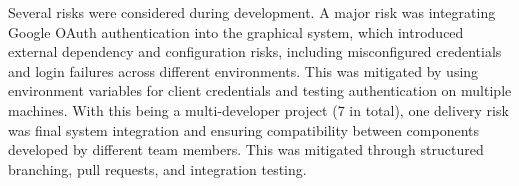 Several risks were considered during development. A major risk was integrating Google OAuth authentication into the graphical system, which introduced external dependency and configuration risks, including misconfigured credentials and login failures across different environments. This was mitigated by using environment variables for client credentials and testing authentication on multiple machines. With this being a multi-developer project (7 in total), one delivery risk was final system integration and ensuring compatibility between components developed by different team members. This was mitigated through structured branching, pull requests, and integration testing.
